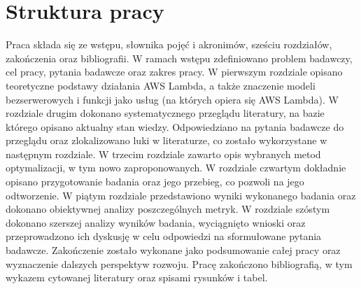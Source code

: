 \section*{Struktura pracy}\label{chapter:struktura_pracy}

Praca składa się ze wstępu, słownika pojęć i akronimów, sześciu rozdziałów, zakończenia oraz bibliografii.
W ramach wstępu zdefiniowano problem badawczy, cel pracy, pytania badawcze oraz zakres pracy.
W pierwszym rozdziale opisano teoretyczne podstawy działania AWS Lambda, a także znaczenie modeli bezserwerowych i funkcji jako usług (na których opiera się AWS Lambda).
W rozdziale drugim dokonano systematycznego przeglądu literatury, na bazie którego opisano aktualny stan wiedzy.
Odpowiedziano na pytania badawcze do przeglądu oraz zlokalizowano luki w literaturze, co zostało wykorzystane w następnym rozdziale.
W trzecim rozdziale zawarto opis wybranych metod optymalizacji, w tym nowo zaproponowanych.
W rozdziale czwartym dokładnie opisano przygotowanie badania oraz jego przebieg, co pozwoli na jego odtworzenie.
W piątym rozdziale przedstawiono wyniki wykonanego badania oraz dokonano obiektywnej analizy poszczególnych metryk.
W rozdziale szóstym dokonano szerszej analizy wyników badania, wyciągnięto wnioski oraz przeprowadzono ich dyskusję w celu odpowiedzi na sformułowane pytania badawcze.
Zakończenie zostało wykonane jako podsumowanie całej pracy oraz wyznaczenie dalszych perspektyw rozwoju.
Pracę zakończono bibliografią, w tym wykazem cytowanej literatury oraz spisami rysunków i tabel.
